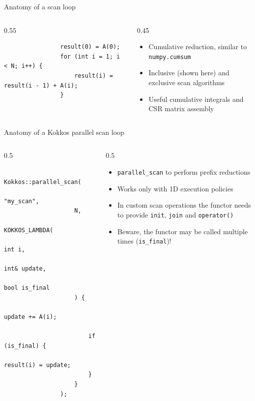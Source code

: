 \documentclass[
    aspectratio=169,
    \createHandout
]{beamer}
\begin{document}
\begin{frame}[fragile]{Anatomy of a scan loop}
    \begin{columns}
        \begin{column}{0.55\linewidth}
            \begin{verbatim}
                result(0) = A(0);
                for (int i = 1; i < N; i++) {
                    result(i) = result(i - 1) + A(i);
                }
            \end{verbatim}
        \end{column}
        \begin{column}{0.45\linewidth}
            \begin{itemize}
                \item Cumulative reduction, similar to \texttt{numpy.cumsum}
                \item Inclusive (shown here) and exclusive scan algorithms
                \item Useful cumulative integrals and CSR matrix assembly
            \end{itemize}
        \end{column}
    \end{columns}
\end{frame}

\begin{frame}[fragile]{Anatomy of a Kokkos parallel scan loop}
    \begin{columns}
        \begin{column}{0.5\linewidth}
            \begin{verbatim}
                Kokkos::parallel_scan(
                    "my_scan",
                    N,
                    KOKKOS_LAMBDA(
                        int i,
                        int& update,
                        bool is_final
                    ) {
                        update += A(i);

                        if (is_final) {
                            result(i) = update;
                        }
                    }
                );
            \end{verbatim}
        \end{column}
        \begin{column}{0.5\linewidth}
            \begin{itemize}
                \item \texttt{parallel_scan} to perform prefix reductions
                \item Works only with 1D execution policies
                \item In custom scan operations the functor needs to provide \texttt{init}, \texttt{join} and \texttt{operator()}
                \item Beware, the functor may be called multiple times (\texttt{is\_final})!
            \end{itemize}
        \end{column}
    \end{columns}
\end{frame}
\end{document}

